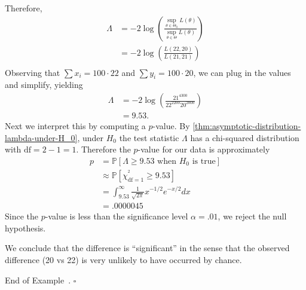 \documentclass[10pt]{article}
\theoremstyle{definition}
\newtheorem{example}[theorem]{Example}
\renewenvironment{example}
{\begin{oldexample}}
  {\par\smallskip\hfill   End of Example~\theexample. $\square$    \par\end{oldexample}}
\newcommand{\1}[1]{\textbf{1}_{\left[#1\right]}} %
\def\P{\mathbb{P}} %
\begin{document}
\begin{example}[Example 10.25 in textbook]
  Therefore,
  \begin{align*}
    \Lambda 
    &= -2 \log\left( \frac{\sup_{\theta\in \Theta_{0}}L(\theta)}{\sup_{\theta\in \Theta}L(\theta)} \right)\\
    &= -2 \log\left( \frac{L(22,20)}{L(21,21)}\right)\\
  \end{align*}
  Observing that $\sum x_{i}=100\cdot 22$ and $\sum y_{i}=100\cdot20$, we can
  plug in the values and simplify, yielding
  \begin{align*}
    \Lambda
    &= -2 \log\left(\frac{21^{4300}}{22^{2200}20^{2000}} \right)\\ 
    &= 9.53.
  \end{align*}
  Next we interpret this by computing a $p$-value. By
  \cref{thm:asymptotic-distribution-lambda-under-H_0}, under $H_{0}$ the test
  statistic $\Lambda$ has a chi-squared distribution with $\text{df}=2-1=1$.
  Therefore the $p$-value for our data is approximately
  \begin{align*}
    p 
    &= \P\left[\Lambda \geq 9.53 \text{ when $H_{0}$ is true}\right]\\
    &\approx \P\left[\chi_{\text{df}=1}^{^{2}}\geq 9.53\right]\\
    &= \int_{9.53}^{\infty}\frac{1}{\sqrt{2\pi}}x^{-1/2}e^{-x/2}dx\\ 
    &=.0000045
  \end{align*}
  Since the $p$-value is less than the significance level $\alpha=.01$, we
  reject the null hypothesis.

  We conclude that the difference is ``significant'' in the sense that the
  observed difference (20 vs 22) is very unlikely to have occurred by chance.

\end{example}
\end{document}
